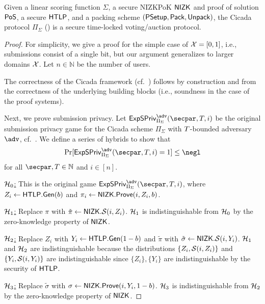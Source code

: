 \begin{theorem}\label{thm:cicada}
    Given a linear scoring function $\Sigma$, a secure NIZKPoK $\mathsf{NIZK}$ and proof of solution ${\sf PoS}$, a secure $\mathsf{HTLP}$, and a packing scheme $({\sf PSetup},\allowbreak \mathsf{Pack},\allowbreak \mathsf{Unpack})$, the Cicada protocol $\Pi_\Sigma$ () is a secure time-locked voting/auction protocol. %
\end{theorem}

\begin{proof}
\def\Exp{\ensuremath{\mathsf{ExpSPriv}_{\Pi_\Sigma}^\adv(\secpar,\Ttime,i)}}
    For simplicity, we give a proof for the simple case of $\mathcal{X}=[0,1]$, i.e., submissions consist of a single bit, but our argument generalizes to larger domains $\mathcal{X}$. Let $n \in \mathbb{N}$ be the number of users.

    The correctness of the Cicada framework (cf.~) follows by construction and from the correctness of the underlying building blocks (i.e., soundness in the case of the proof systems).
    
    Next, we prove submission privacy.
    Let $\Exp$ be the original submission privacy game for the Cicada scheme $\Pi_\Sigma$ with $T$-bounded adversary $\adv$, cf.~. We define a series of hybrids to show that 
    \[ 
        \Pr[\Exp = 1] \leq \negl 
    \]
    for all $\secpar,\Ttime \in \mathbb{N}$ and $i\in[n]$.
    
    \underline{$\mathcal{H}_0$:} This is the original game $\Exp$, where $Z_i \gets \mathsf{HTLP}.{\sf Gen}(b)$ and $\pi_i \gets \mathsf{NIZK}.\mathsf{Prove}(i, Z_i, b)$.
    
    \underline{$\mathcal{H}_1$:} Replace $\pi$ with $\tilde{\pi} \gets {\sf NIZK}.\mathcal{S}(i, Z_i)$. $\mathcal{H}_1$ is indistinguishable from $\mathcal{H}_0$ by the zero-knowledge property of $\sf NIZK$.

    \underline{$\mathcal{H}_2$:} Replace $Z_i$ with $Y_i \gets \mathsf{HTLP}.{\sf Gen}(1-b)$ and $\tilde{\pi}$ with $\tilde{\sigma} \gets {\sf NIZK}.\mathcal{S}(i, Y_i)$. $\mathcal{H}_1$ and $\mathcal{H}_2$ are indistinguishable because the distributions $\{Z_i, \mathcal{S}(i, Z_i)\}$ and $\{Y_i, \mathcal{S}(i, Y_i)\}$ are indistinguishable since $\{Z_i\}, \{Y_i\}$ are indistinguishable by the security of $\mathsf{HTLP}$.

    \underline{$\mathcal{H}_3$:} Replace $\tilde{\sigma}$ with $\sigma \gets \mathsf{NIZK}.\mathsf{Prove}(i, Y_i, 1-b)$. $\mathcal{H}_3$ is indistinguishable from $\mathcal{H}_2$ by the zero-knowledge property of $\sf NIZK$.


\end{proof}
